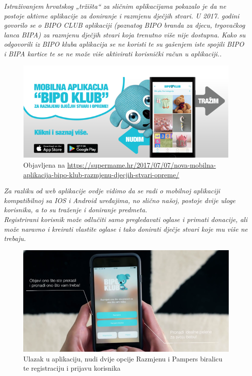 		\textit{Istraživanjem hrvatskog „tržišta“ za sličnim aplikacijama pokazalo je da ne postoje aktivne aplikacije za doniranje i razmjenu dječjih stvari. U 2017. godini govorilo se o BIPO CLUB aplikaciji (poznatog BIPO branda za djecu, trgovačkog lanca BIPA) za razmjenu dječjih stvari koja trenutno više nije dostupna. Kako su odgovorili iz BIPO kluba aplikacija se ne koristi te su gašenjem iste spojili BIPO i BIPA kartice te se ne može više aktivirati korisnički račun u aplikaciji..}
		\begin{figure}[h!]
			\center
			\includegraphics[width = \linewidth]{Picture1.png}
			\caption{Objavljena na \url{https://supermame.hr/2017/07/07/nova-mobilna-aplikacija-bipo-klub-razmjenu-djecjih-stvari-opreme/}}
			\label{fig1}
		\end{figure}
		\newline
		\textit{Za razliku od web aplikacije ovdje vidimo da se radi o mobilnoj aplikaciji kompatibilnoj sa IOS i Android uređajima, no slično našoj, postoje dvije uloge korisnika, a to su traženje i doniranje predmeta. }\\
		\newline
		\textit{Registrirani korisnik može odlučiti samo pregledavati oglase i primati donacije, ali može naravno i kreirati vlastite oglase i tako donirati dječje stvari koje mu više ne trebaju.}\\
		\newline
		\begin{figure}[h!]
			\center
			\includegraphics{Picture2.png}
			\caption{ Ulazak u aplikaciju, nudi dvije opcije Razmjenu i Pampers biralicu te registraciju i prijavu korisnika}
			\label{fig2}
		\end{figure}
